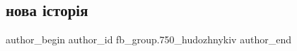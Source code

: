  
 
 
 
 

\subsection{нова історія}
\label{sec:12_03_2018.fb.fb_group.750_hudozhnykiv.1.nova_istoria}

\ifcmt
 author_begin
   author_id fb_group.750_hudozhnykiv
 author_end
\fi

